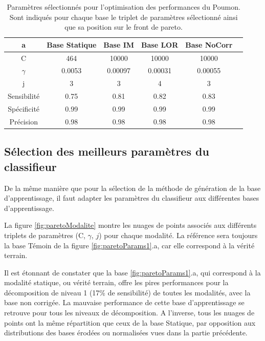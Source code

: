 \begin{table}[h!]
		\begin{tabular}{c| c c c c c}
  \hline
  a	& Base Statique	& Base IM	& Base LOR	& Base NoCorr	\\
  \hline
 C 	& 464		& 10000		& 10000		& 10000		\\
\hline
$\gamma$& 0.0053	& 0.00097	& 0.00031	& 0.00055	\\
\hline
j	& 3		& 3		& 4		& 3		\\
\hline
\hline
Sensibilité& 0.75	& 0.81		& 0.82		& 0.83	\\
\hline
Spécificité& 0.99	& 0.99		& 0.99		& 0.99		\\
\hline
Précision& 0.98		& 0.98		& 0.98		& 0.98		\\
\hline
 		\end{tabular}

\caption{Paramètres sélectionnés pour l'optimisation des performances du Poumon. Sont indiqués pour chaque base le triplet de paramètres sélectionné ainsi que sa position sur le front de pareto.}
\label{fig:paramsModPoumon}
\end{table}

\subsection{Sélection des meilleurs paramètres du classifieur}

De la même manière que pour la sélection de la méthode de génération de la base d'apprentissage, il faut adapter les paramètres du classifieur aux différentes bases d'apprentissage.

La figure \ref{fig:paretoModalite} montre les nuages de points associés aux différents triplets de paramètres (C, $\gamma$, $j$) pour chaque modalité. La référence sera toujours la base Témoin de la figure \ref{fig:paretoParams1}.a, car elle correspond à la vérité terrain.

Il est étonnant de constater que la base \ref{fig:paretoParams1}.a, qui correspond à la modalité statique, ou vérité terrain, offre les pires performances pour la décomposition de niveau 1 (17\% de sensibilité) de toutes les modalités, avec la base non corrigée. La mauvaise performance de cette base d'apprentissage se retrouve pour tous les niveaux de décomposition. A l'inverse, tous les nuages de points ont la même répartition que ceux de la base Statique, par opposition aux distributions des bases érodées ou normalisées vues dans la partie précédente.


